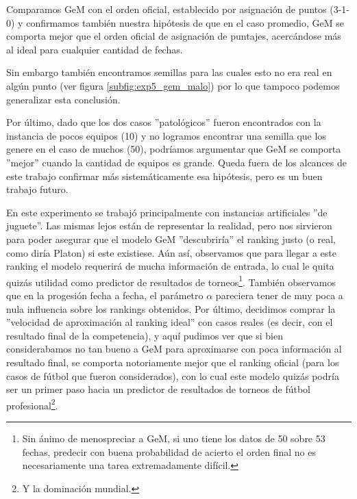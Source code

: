 \par Comparamos GeM con el orden oficial, establecido por asignación de puntos
(3-1-0) y confirmamos tambi\'en nuestra hip\'otesis de que en el caso promedio,
GeM se comporta mejor que el orden oficial de asignaci\'on de puntajes,
acerc\'andose más al ideal para cualquier cantidad de fechas.

\par Sin embargo tambi\'en encontramos semillas para las cuales esto no era real
en alg\'un punto (ver figura \ref{subfig:exp5_gem_malo}) por lo que tampoco
podemos generalizar esta conclusi\'on.

\par Por \'ultimo, dado que los dos casos ''patol\'ogicos'' fueron encontrados
con la instancia de pocos equipos (10) y no logramos encontrar una semilla que
los genere en el caso de muchos (50), podr\'iamos argumentar que GeM se comporta
''mejor'' cuando la cantidad de equipos es grande. Queda fuera de los alcances
de este trabajo confirmar m\'as sistem\'aticamente esa hip\'otesis, pero es un
buen trabajo futuro.

\medskip
\par En este experimento se trabaj\'o principalmente con instancias artificiales
''de juguete''. Las mismas lejos est\'an de representar la realidad, pero nos
sirvieron para poder asegurar que el modelo GeM ''descubrir\'ia'' el ranking
justo (o real, como dir\'ia Platon) si este existiese. A\'un as\'i, observamos
que para llegar a este ranking el modelo requerir\'a de mucha informaci\'on de
entrada, lo cual le quita quiz\'as utilidad como predictor de resultados de
torneos\footnote{Sin \'animo de menospreciar a GeM, si uno tiene los datos de 50
sobre 53 fechas, predecir con buena probabilidad de acierto el orden final no es
necesariamente una tarea extremadamente dif\'icil.}. Tambi\'en observamos que en
la progesi\'on fecha a fecha, el par\'ametro $\alpha$ pareciera tener de muy
poca a nula influencia sobre los rankings obtenidos. Por \'ultimo, decidimos
comprar la ''velocidad de aproximaci\'on al ranking ideal'' con casos reales (es
decir, con el resultado final de la competencia), y aqu\'i pudimos ver que si
bien considerabamos no tan bueno a GeM para aproximarse con poca informaci\'on
al resultado final, se comporta notoriamente mejor que el ranking oficial (para
los casos de f\'utbol que fueron considerados), con lo cual este modelo quiz\'as
podr\'ia ser un primer paso hacia un predictor de resultados de torneos de
f\'utbol profesional\footnote{Y la dominaci\'on mundial.}.
